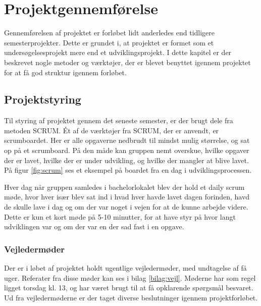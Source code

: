 \thispagestyle{fancy}
\chapter{Projektgennemførelse}
\label{chp:projektgennemforsel}

Gennemførelsen af projektet er forløbet lidt anderledes end tidligere semesterprojekter. Dette er grundet i, at projektet er formet som et undersøgelsesprojekt mere end et udviklingsprojekt. I dette kapitel er der beskrevet nogle metoder og værktøjer, der er blevet benyttet igennem projektet for at få god struktur igennem forløbet.

\section{Projektstyring}
\label{sec:projektstyring}

Til styring af projektet gennem det seneste semester, er der brugt dele fra metoden SCRUM.
Ét af de værktøjer fra SCRUM, der er anvendt, er scrumboardet. Her er alle opgaverne nedbrudt til mindst mulig størrelse, og sat op på et scrumboard. På den måde kan gruppen nemt overskue, hvilke opgaver der er lavet, hvilke der er under udvikling, og hvilke der mangler at blive lavet. På figur \ref{fig:scrum} ses et eksempel på boardet fra en dag i udviklingsprocessen. 


Hver dag når gruppen samledes i bachelorlokalet blev der hold et daily scrum møde, hvor hver især blev sat ind i hvad hver havde lavet dagen forinden, havd de skulle lave i dag og om der var noget i vejen for at de kunne arbejde videre. Dette er kun et kort møde på 5-10 minutter, for at have styr på hvor langt udviklingen var og om der var en der sad fast i en opgave.

\subsection{Vejledermøder}
Der er i løbet af projektet holdt ugentlige vejledermøder, med undtagelse af få uger. Referater fra disse møder kan ses i bilag \ref{bilag:vejl}. Møderne har som regel ligget torsdag kl. 13, og har været brugt til at få opklarende spørgsmål besvaret. Ud fra vejledermøderne er der taget diverse beslutninger igennem projektforløbet.


